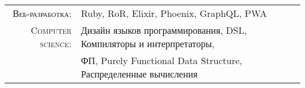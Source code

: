 
\vspace{1em}
\begin{tabular}{rl}

    \textsc{Веб-разработка:} & Ruby, RoR, Elixir, Phoenix, GraphQL, PWA \\
    \textsc{Computer science:} & Дизайн языков программирования, DSL, Компиляторы и интерпретаторы,\\
                               & ФП, Purely Functional Data Structure, Распределенные вычисления \\

\end{tabular}
